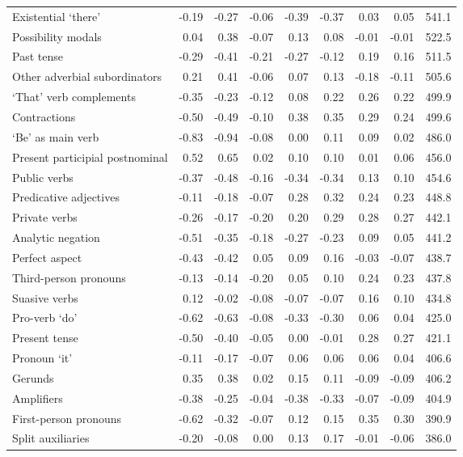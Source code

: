 \begin{table}[!t]
\begin{tabular*}{\linewidth}{@{\extracolsep{\fill}}lrrrrrrrr}
Existential ‘there’ & -0.19 & -0.27 & -0.06 & -0.39 & -0.37 & 0.03 & 0.05 & 541.1 \\ 
Possibility modals & 0.04 & 0.38 & -0.07 & 0.13 & 0.08 & -0.01 & -0.01 & 522.5 \\ 
Past tense & -0.29 & -0.41 & -0.21 & -0.27 & -0.12 & 0.19 & 0.16 & 511.5 \\ 
Other adverbial subordinators & 0.21 & 0.41 & -0.06 & 0.07 & 0.13 & -0.18 & -0.11 & 505.6 \\ 
‘That’ verb complements & -0.35 & -0.23 & -0.12 & 0.08 & 0.22 & 0.26 & 0.22 & 499.9 \\ 
Contractions & -0.50 & -0.49 & -0.10 & 0.38 & 0.35 & 0.29 & 0.24 & 499.6 \\ 
‘Be’ as main verb & -0.83 & -0.94 & -0.08 & 0.00 & 0.11 & 0.09 & 0.02 & 486.0 \\ 
Present participial postnominal & 0.52 & 0.65 & 0.02 & 0.10 & 0.10 & 0.01 & 0.06 & 456.0 \\ 
Public verbs & -0.37 & -0.48 & -0.16 & -0.34 & -0.34 & 0.13 & 0.10 & 454.6 \\ 
Predicative adjectives & -0.11 & -0.18 & -0.07 & 0.28 & 0.32 & 0.24 & 0.23 & 448.8 \\ 
Private verbs & -0.26 & -0.17 & -0.20 & 0.20 & 0.29 & 0.28 & 0.27 & 442.1 \\ 
Analytic negation & -0.51 & -0.35 & -0.18 & -0.27 & -0.23 & 0.09 & 0.05 & 441.2 \\ 
Perfect aspect & -0.43 & -0.42 & 0.05 & 0.09 & 0.16 & -0.03 & -0.07 & 438.7 \\ 
Third-person pronouns & -0.13 & -0.14 & -0.20 & 0.05 & 0.10 & 0.24 & 0.23 & 437.8 \\ 
Suasive verbs & 0.12 & -0.02 & -0.08 & -0.07 & -0.07 & 0.16 & 0.10 & 434.8 \\ 
Pro-verb ‘do’ & -0.62 & -0.63 & -0.08 & -0.33 & -0.30 & 0.06 & 0.04 & 425.0 \\ 
Present tense & -0.50 & -0.40 & -0.05 & 0.00 & -0.01 & 0.28 & 0.27 & 421.1 \\ 
Pronoun ‘it’ & -0.11 & -0.17 & -0.07 & 0.06 & 0.06 & 0.06 & 0.04 & 406.6 \\ 
Gerunds & 0.35 & 0.38 & 0.02 & 0.15 & 0.11 & -0.09 & -0.09 & 406.2 \\ 
Amplifiers & -0.38 & -0.25 & -0.04 & -0.38 & -0.33 & -0.07 & -0.09 & 404.9 \\ 
First-person pronouns & -0.62 & -0.32 & -0.07 & 0.12 & 0.15 & 0.35 & 0.30 & 390.9 \\ 
Split auxiliaries & -0.20 & -0.08 & 0.00 & 0.13 & 0.17 & -0.01 & -0.06 & 386.0 \\ 

\end{tabular*}
\end{table}
